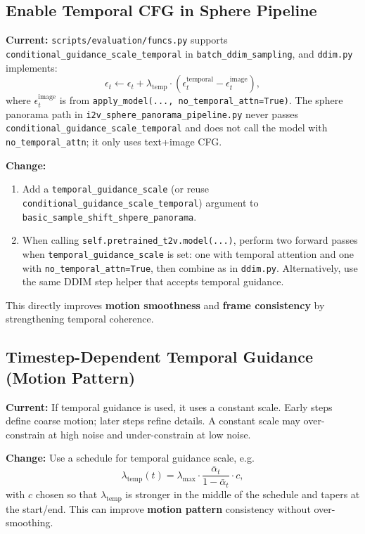 \documentclass[11pt,a4paper]{article}
\newcommand{\file}[1]{\texttt{#1}}
\newcommand{\fn}[1]{\texttt{#1}}
\begin{document}
\subsection{Enable Temporal CFG in Sphere Pipeline}
\label{sec:motion}

\textbf{Current:} \file{scripts/evaluation/funcs.py} supports \fn{conditional\_guidance\_scale\_temporal} in \fn{batch\_ddim\_sampling}, and \file{ddim.py} implements:
\begin{equation}
\epsilon_t \leftarrow \epsilon_t + \lambda_{\text{temp}} \cdot (\epsilon_t^{\text{temporal}} - \epsilon_t^{\text{image}}),
\end{equation}
where $\epsilon_t^{\text{image}}$ is from \fn{apply\_model(..., no\_temporal\_attn=True)}. The sphere panorama path in \file{i2v\_sphere\_panorama\_pipeline.py} never passes \fn{conditional\_guidance\_scale\_temporal} and does not call the model with \fn{no\_temporal\_attn}; it only uses text+image CFG.

\textbf{Change:}
\begin{enumerate}
    \item Add a \fn{temporal\_guidance\_scale} (or reuse \fn{conditional\_guidance\_scale\_temporal}) argument to \fn{basic\_sample\_shift\_shpere\_panorama}.
    \item When calling \fn{self.pretrained\_t2v.model(...)}, perform two forward passes when \fn{temporal\_guidance\_scale} is set: one with temporal attention and one with \fn{no\_temporal\_attn=True}, then combine as in \file{ddim.py}. Alternatively, use the same DDIM step helper that accepts temporal guidance.
\end{enumerate}
This directly improves \textbf{motion smoothness} and \textbf{frame consistency} by strengthening temporal coherence.

\subsection{Timestep-Dependent Temporal Guidance (Motion Pattern)}

\textbf{Current:} If temporal guidance is used, it uses a constant scale. Early steps define coarse motion; later steps refine details. A constant scale may over-constrain at high noise and under-constrain at low noise.

\textbf{Change:} Use a schedule for temporal guidance scale, e.g.\
\begin{equation}
\lambda_{\text{temp}}(t) = \lambda_{\max} \cdot \frac{\bar{\alpha}_t}{1-\bar{\alpha}_t} \cdot c,
\end{equation}
with $c$ chosen so that $\lambda_{\text{temp}}$ is stronger in the middle of the schedule and tapers at the start/end. This can improve \textbf{motion pattern} consistency without over-smoothing.
\end{document}
